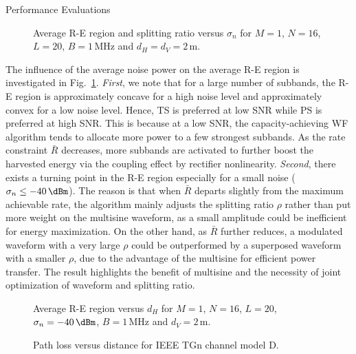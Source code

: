 \documentclass[journal]{IEEEtran}
\begin{document}
\begin{section}{Performance Evaluations}
		\begin{figure}[!t]
			\centering
			\begin{adjustbox}{width=\linewidth}
				
			\end{adjustbox}
			\caption{Average R-E region and splitting ratio versus $\sigma_n$ for $M=1$, $N=16$, $L=20$, $B=1\,\si{\MHz}$ and $d_H=d_V=2\,\si{\meter}$.}
			\label{fi:re_noise}
		\end{figure}

		The influence of the average noise power on the average R-E region is investigated in Fig.~\ref{fi:re_noise}. \textit{First}, we note that for a large number of subbands, the R-E region is approximately concave for a high noise level and approximately convex for a low noise level. Hence, TS is preferred at low SNR while PS is preferred at high SNR. This is because at a low SNR, the capacity-achieving WF algorithm tends to allocate more power to a few strongest subbands. As the rate constraint $\bar{R}$ decreases, more subbands are activated to further boost the harvested energy via the coupling effect by rectifier nonlinearity. \textit{Second}, there exists a turning point in the R-E region especially for a small noise ($\sigma_n \le -40\,\si{\dBm}$). The reason is that when $\bar{R}$ departs slightly from the maximum achievable rate, the algorithm mainly adjusts the splitting ratio $\rho$ rather than put more weight on the multisine waveform, as a small amplitude could be inefficient for energy maximization. On the other hand, as $\bar{R}$ further reduces, a modulated waveform with a very large $\rho$ could be outperformed by a superposed waveform with a smaller $\rho$, due to the advantage of the multisine for efficient power transfer. The result highlights the benefit of multisine and the necessity of joint optimization of waveform and splitting ratio.

		\begin{figure}[!t]
			\centering
			\begin{adjustbox}{width=\linewidth}
				
			\end{adjustbox}
			\caption{Average R-E region versus $d_H$ for $M=1$, $N=16$, $L=20$, $\sigma_n=-40\,\si{\dBm}$, $B=1\,\si{\MHz}$ and $d_V=2\,\si{\meter}$.}
			\label{fi:re_distance}
		\end{figure}

		\begin{figure}[!t]
			\centering
			\begin{adjustbox}{width=\linewidth}
				
			\end{adjustbox}
			\caption{Path loss versus distance for IEEE TGn channel model D.}
			\label{fi:path_loss}
		\end{figure}


\end{section}
\end{document}

